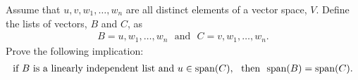 \begin{question}\label{que:SpanAgain}
    \normalfont

    Assume that  $u,v,w_1,\dots,w_n$ are all distinct elements of a vector space, $V$.  Define the lists of vectors, $B$ and $C$, as
    \begin{align*}
        B =  u, w_1,\dots, w_n \ \ \ \text{and}\ \ \
        C =  v, w_1,\dots, w_n .
    \end{align*}
    Prove the following implication:
    \begin{align*}
        \text{if}\ B\ \text{is a linearly independent list and}\  u\in\textnormal{span}(C),\ \ \text{then}\ \ \textnormal{span}(B)=\textnormal{span}(C).
    \end{align*}
\end{question}
